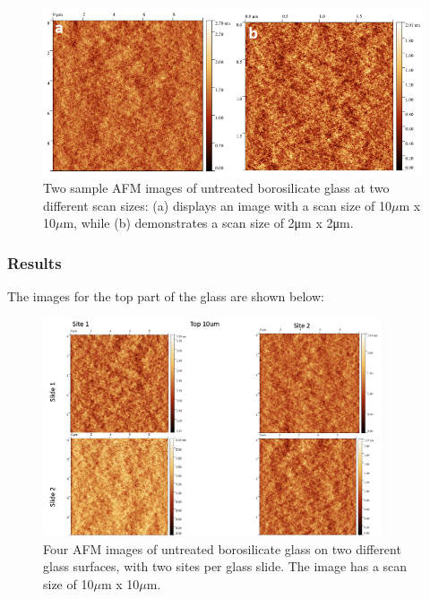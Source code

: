 \begin{figure}[h]     %
        \begin{center}
          \includegraphics[width=120mm]{chapter3/Figure9.png}
\end{center}
\caption{Two sample AFM images of untreated borosilicate glass at two different scan sizes: (a) displays an image with a scan size of 10$\mu$m x 10$\mu$m, while (b) demonstrates a scan size of 2μm x 2μm.}
\label{fig:figure9}                 %
\end{figure}   

\newpage
\subsubsection{Results}

The images for the top part of the glass are shown below:

\begin{figure}[h!!!!]     %
        \begin{center}
          \includegraphics[width=100mm]{chapter3/Top 10um.png}
\end{center}
\caption{Four AFM images of untreated borosilicate glass on two different glass surfaces, with two sites per glass slide. The image has a scan size of 10$\mu$m x 10$\mu$m.}
\label{fig:figure9}                 %
\end{figure}   

